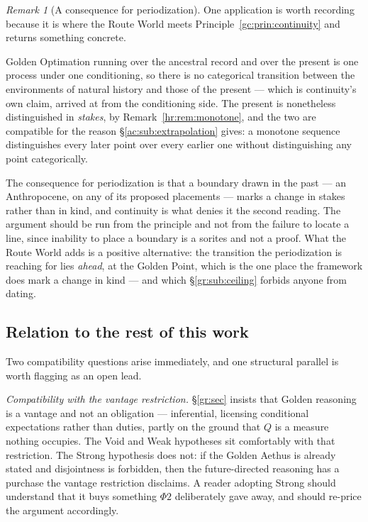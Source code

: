\documentclass[11pt]{article}
\numberwithin{equation}{section}
\theoremstyle{plain}
\theoremstyle{definition}
\theoremstyle{remark}
\newtheorem{remark}[theorem]{Remark}
\begin{document}
\begin{remark}[A consequence for periodization]\label{gc:rem:periodization}
One application is worth recording because it is where the Route World
meets Principle~\ref{gc:prin:continuity} and returns something concrete.

Golden Optimation running over the ancestral record and over the present
is one process under one conditioning, so there is no categorical
transition between the environments of natural history and those of the
present --- which is continuity's own claim, arrived at from the
conditioning side. The present is nonetheless distinguished in
\emph{stakes}, by Remark~\ref{hr:rem:monotone}, and the two are
compatible for the reason \S\ref{ac:sub:extrapolation} gives: a
monotone sequence distinguishes every later point over every earlier one
without distinguishing any point categorically.

The consequence for periodization is that a boundary drawn in the past
--- an Anthropocene, on any of its proposed placements --- marks a
change in stakes rather than in kind, and continuity is what denies it
the second reading. The argument should be run from the principle and
not from the failure to locate a line, since inability to place a
boundary is a sorites and not a proof. What the Route World adds is a
positive alternative: the transition the periodization is reaching for
lies \emph{ahead}, at the Golden Point, which is the one place the
framework does mark a change in kind --- and which
\S\ref{gr:sub:ceiling} forbids anyone from dating.
\end{remark}

\subsection{Relation to the rest of this work}\label{gc:sub:relation}

Two compatibility questions arise immediately, and one structural
parallel is worth flagging as an open lead.

\emph{Compatibility with the vantage restriction.}
\S\ref{gr:sec} insists that Golden reasoning is a vantage and not an
obligation --- inferential, licensing conditional expectations rather
than duties, partly on the ground that $Q$ is a measure nothing
occupies. The Void and Weak hypotheses sit comfortably with that
restriction. The Strong hypothesis does not: if the Golden Aethus is
already stated and disjointness is forbidden, then the future-directed
reasoning has a purchase the vantage restriction disclaims. A reader
adopting Strong should understand that it buys something
$\Phi2$ deliberately gave away, and should re-price the argument
accordingly.
\end{document}
